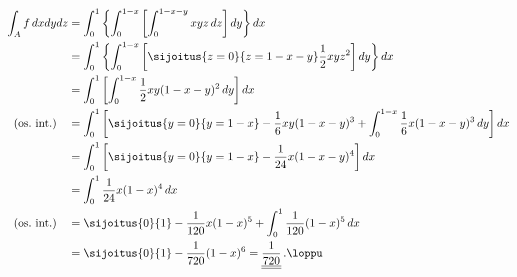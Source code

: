 \begin{align*}
\int_A f\,dxdydz 
&= \int_0^1\left\{\int_0^{1-x}\left[\int_0^{1-x-y} xyz\,dz\right]dy\right\}dx \\
&= \int_0^1\left\{\int_0^{1-x}\left[\sijoitus{z=0}{z=1-x-y}
                                   \frac{1}{2}xyz^2\right]dy\right\}dx \\
&= \int_0^1\left[\int_0^{1-x} \frac{1}{2}xy(1-x-y)^2\,dy\right]dx \\
(\text{os.\ int.}) \quad 
&= \int_0^1\left[\sijoitus{y=0}{y=1-x} -\frac{1}{6}xy(1-x-y)^3 + \int_0^{1-x}
                 \frac{1}{6} x(1-x-y)^3\,dy \right]dx   \\
&= \int_0^1\left[\sijoitus{y=0}{y=1-x} -\frac{1}{24}x(1-x-y)^4 \right]dx \\
&= \int_0^1 \frac{1}{24} x(1-x)^4\,dx \\
(\text{os.\ int.}) \quad
&= \sijoitus{0}{1} -\frac{1}{120}x(1-x)^5 + \int_0^1 \frac{1}{120} (1-x)^5\,dx \\
&= \sijoitus{0}{1} -\frac{1}{720}(1-x)^6 = \underline{\underline{\frac{1}{720}}}\,. \loppu
\end{align*}

